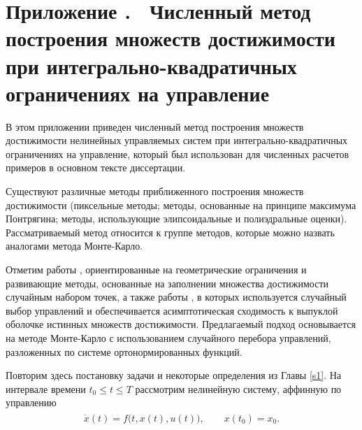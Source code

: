\documentclass[../main.tex]{subfiles}
\begin{document}
\clearpage
\setcounter{section}{0}%
\renewcommand{\thesection}{\Alph{section}}%
\section*{Приложение .  Численный метод построения множеств достижимости при интегрально-квадратичных ограничениях на управление}%
\label{app:A}%
\renewcommand{\theequation}{\Alph{section}.\arabic{equation}}%
\setcounter{equation}{0}
  В этом приложении приведен численный метод построения множеств достижимости нелинейных управляемых систем при интегрально-квадратичных ограничениях на управление, который был использован для численных расчетов примеров в основном тексте диссертации.  
  
  
  Существуют различные методы приближенного построения  множеств достижимости (пиксельные методы; методы, основанные на принципе максимума Понтрягина; методы, использующие элипсоидальные и полиэдральные оценки).  
  Рассматриваемый метод относится к группе методов, которые можно назвать аналогами метода Монте-Карло. 
   
  Отметим работы \cite{Gornov2015, Gornov2017}, ориентированные на геометрические ограничения и развивающие методы, основанные на заполнении множества достижимости случайным набором точек, а также работы \cite{Lew2020, Lew2022}, в которых используется случайный выбор управлений и обеспечивается асимптотическая сходимость к выпуклой оболочке истинных множеств достижимости.
  Предлагаемый подход основывается на методе Монте-Карло с использованием случайного перебора управлений, разложенных по системе ортонормированных функций.
  
  Повторим здесь постановку задачи и некоторые определения из Главы \ref{s1}.
  На интервале времени $ t_0 \leqslant t \leqslant {T} $ рассмотрим нелинейную систему, аффинную по управлению
  \begin{gather}\label{a1:common_nonlinear}
  	\begin{gathered}
  		\dot{x}(t)=f\big(t, x(t), u(t)\big), \qquad x(t_0) = x_0.
  	\end{gathered}
  \end{gather}
  
\end{document}
